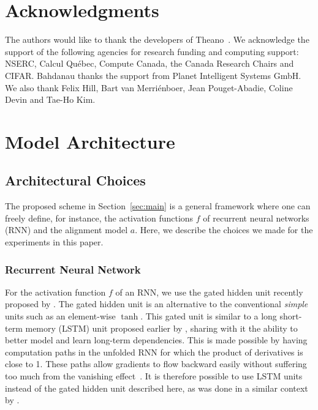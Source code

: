 \documentclass{article}
\begin{document}
\section*{Acknowledgments}

The authors would like to thank the developers of
Theano~\citep{bergstra+al:2010-scipy,Bastien-Theano-2012}.  We  acknowledge the
support of the following agencies for research funding and computing support:
NSERC, Calcul Qu\'{e}bec, Compute Canada, the Canada Research Chairs and CIFAR.
Bahdanau thanks the support from Planet Intelligent Systems GmbH.  We also thank
Felix Hill, Bart van Merri\'enboer, Jean Pouget-Abadie, Coline Devin and
Tae-Ho Kim. 




\newpage
\appendix
\section{Model Architecture}
\label{sec:model_detail}

\subsection{Architectural Choices}

The proposed scheme in Section~\ref{sec:main} is a general framework where one
can freely define, for instance, the activation functions $f$ of recurrent
neural networks (RNN) and the alignment model $a$. Here, we describe the
choices we made for the experiments in this paper. 

\subsubsection{Recurrent Neural Network}
\label{sec:gatedrnn}

For the activation function $f$ of an RNN, we use the gated hidden unit
recently proposed by \citet{Cho2014}. The gated hidden unit is an alternative
to the conventional {\it simple} units such as an element-wise $\tanh$.  This
gated unit is similar to a long short-term memory (LSTM) unit proposed earlier
by \citet{Hochreiter+Schmidhuber-1997}, sharing with it the ability to better
model and learn long-term dependencies. This is made possible by having
computation paths in the unfolded RNN for which the product of derivatives is
close to 1.  These paths allow gradients to flow backward easily without
suffering too much from the vanishing
effect~\citep{Hochreiter91,Bengio-trnn93,Pascanu+al-ICML2013-small}. It is
therefore possible to use LSTM units instead of the gated hidden unit described
here, as was done in a similar context by \citet{Sutskever2014}.
\end{document}
